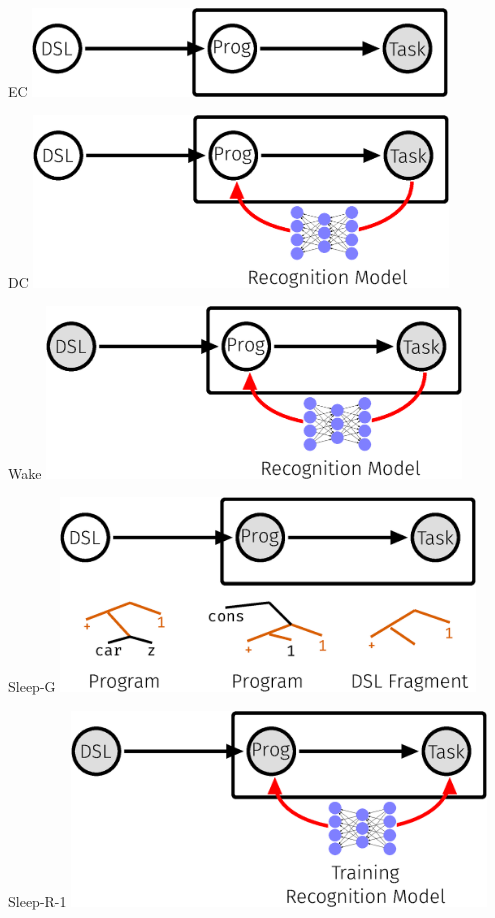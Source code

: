 \documentclass{beamer}
\begin{document}
\begin{frame}[t]{EC}
  \includegraphics[width = 11cm]{figures/animation/EC.eps}
\end{frame}
\begin{frame}[t]{DC}
  \includegraphics[width = 11cm]{figures/animation/DC.eps}
\end{frame}
\begin{frame}[t]{Wake}
  \includegraphics[width = 11cm]{figures/animation/Wake.eps}
\end{frame}
\begin{frame}[t]{Sleep-G}
  \includegraphics[width = 11cm]{figures/animation/Sleep-G.eps}
\end{frame}
\begin{frame}[t]{Sleep-R-1}
  \includegraphics[width = 11cm]{figures/animation/Sleep-R-1.eps}
\end{frame}
\end{document}
